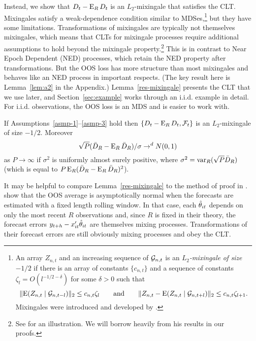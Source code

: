 \documentclass[12pt,draft]{article}
\begin{document}
Instead, we show that $D_t - \operatorname{E}_R D_t$ is an $L_2$-mixingale that
satisfies the CLT. Mixingales satisfy a weak-dependence condition
similar to MDSes,\footnote{%
  An array $Z_{n,t}$ and an increasing sequence of \sfields
  $\mathcal{G}_{n,t}$ is an \emph{$L_2$-mixingale of size $-1/2$} if there is
  an array of constants $\{c_{n,t}\}$ and a sequence of constants
  $\zeta_l = O(l^{-1/2 - \delta})$ for some $\delta > 0$ such that
  \begin{equation*}
    \lVert \operatorname{E}(Z_{n,t} \mid \mathcal{G}_{n,t-l}) \rVert_2
    \leq c_{n,t} \zeta_l
    \qquad\text{and}\qquad
    \lVert Z_{n,t} - \operatorname{E}(Z_{n,t} \mid \mathcal{G}_{n,t+l}) \rVert_2
    \leq c_{n,t} \zeta_{l+1}.
  \end{equation*}
  Mixingales were introduced and developed by
  \citet{Mcl:74,Mcl:75,Mcl:75b,Mcl:77}.} %
but they have some limitations. Transformations of mixingales are
typically not themselves mixingales, which means that CLTs for
mixingale processes require additional assumptions to hold beyond the
mixingale property.\footnote{%
  See \citet{Jon:97} for an illustration. We will borrow heavily from
  his results in our proofs.} %
This is in contrast to Near Epoch Dependent (NED) processes, which
retain the NED property after transformations. \citep[See chapter 17
of][for further discussion of these properties.]{Dav:94} But the OOS
loss has more structure than most mixingales and behaves like an NED
process in important respects. (The key result here is
Lemma~\ref{lem:a2} in the Appendix.) Lemma~\ref{res-mixingale} presents the
CLT that we use later, and Section~\ref{sec:example} works through an
i.i.d. example in detail. For i.i.d. observations, the OOS loss is an
MDS and is easier to work with.

\begin{lem}\label{res-mixingale}
  If Assumptions~\ref{asmp-1}--\ref{asmp-3} hold then $\{D_t - \operatorname{E}_R
  D_t, \mathcal F_t\}$ is an $L_2$-mixingale of size $-1/2$.
  Moreover
  \begin{equation}
    \sqrt{P}(\bar{D}_{R} - \operatorname{E}_R \bar{D}_{R})/\sigma \to^d N(0,1)
  \end{equation}
  as $P \to \infty$ if $\sigma^2$ is uniformly almost surely positive,
  where $\sigma^2 = \operatorname{var}_R(\sqrt{P} \bar{D}_{R})$ (which is equal to $P
  \operatorname{E}_R(\bar{D}_R - \operatorname{E}_R \bar{D}_R)^2$).
\end{lem}

It may be helpful to compare Lemma~\ref{res-mixingale} to the method
of proof in \citet{GiW:06}. \citet{GiW:06} show that the OOS average
is asymptotically normal when the forecasts are estimated with a fixed
length rolling window. In that case, each $\hat\theta_{it}$ depends on only
the most recent $R$ observations and, since $R$ is fixed in their
theory, the forecast errors $y_{t+h} - x_{it}'\hat\theta_{it}$ are themselves
mixing processes. Transformations of their forecast errors are
still obviously mixing processes and obey the CLT.
\end{document}
